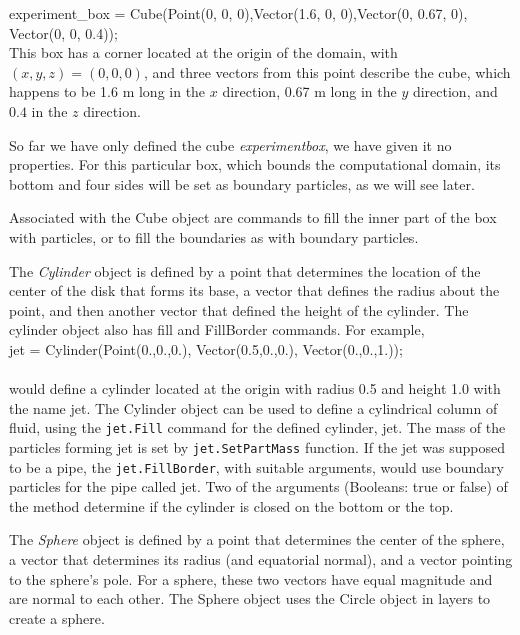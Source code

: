 \documentclass{../GPUSPHtemplate}
\begin{document}
\noindent experiment\_box = Cube(Point(0, 0, 0),Vector(1.6, 0,
0),Vector(0, 0.67, 0), Vector(0, 0, 0.4));\\

This box has a corner located at the origin of the domain, with $(x, y,
z) = (0,0,0)$, and three vectors from this point describe the cube,
which happens to be 1.6 m long in the $x$ direction, 0.67 m long in the
$y$ direction, and $0.4$ in the $z$ direction.

So far we have only defined the cube {\em experiment\-box}, we have
given it no properties. For this particular box, which bounds the
computational domain, its bottom and four sides will be set as boundary
particles, as we will see later.

Associated with the Cube object are commands to fill the inner part of
the box with particles, or to fill the boundaries as with boundary
particles. %


The {\em Cylinder} object is defined by a point that determines the
location of the center of the disk that forms its base, a vector that
defines the radius about the point, and then another vector that defined
the height of the cylinder. The cylinder object also has fill and
FillBorder commands. For example, \\

jet = Cylinder(Point(0.,0.,0.), Vector(0.5,0.,0.), Vector(0.,0.,1.));\\
\\would define a cylinder located at the origin with radius 0.5 and
height 1.0 with the name jet. The Cylinder object can be used to
define a cylindrical column of fluid, using the \verb!jet.Fill!
command for the defined cylinder, jet. The mass of the particles
forming jet is set by \verb!jet.SetPartMass! function. If the jet was
supposed to be a pipe, the \verb!jet.FillBorder!, with suitable
arguments, would use boundary particles for the pipe called jet. Two
of the arguments (Booleans: true or false) of the method determine if
the cylinder is closed on the bottom or the top.

The {\em Sphere} object is defined by a point that determines the center
of the sphere, a vector that determines its radius (and equatorial
normal), and a vector pointing to the sphere's pole. For a sphere,
these two vectors have equal magnitude and are normal to each other.
The Sphere object uses the Circle object in layers to create a sphere.
\end{document}
